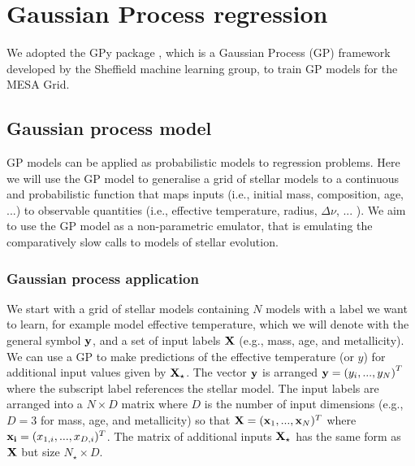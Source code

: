 \section{Gaussian Process regression}\label{GPR}

We adopted the GPy package \citep{gpy2014}, which is a Gaussian Process (GP) framework developed by the Sheffield machine learning group, to train GP models for the \textsc{MESA} Grid. 

\subsection{Gaussian process model}

GP models can be applied as probabilistic models to regression problems.  Here we will use the GP model to generalise a grid of stellar models to a continuous and probabilistic function that maps inputs (i.e., initial mass, composition, age, ...) to observable quantities (i.e., effective temperature, radius, $\Delta \nu$, ... ).  We aim to use the GP model as a non-parametric emulator, that is emulating the comparatively slow calls to models of stellar evolution. 

\subsubsection{Gaussian process application}

We start with a grid of stellar models containing $N$ models with a label we  want to learn, for example model effective temperature, which we will denote with the general symbol $\bf y$, and a set of input labels $\bf X$ (e.g., mass, age, and metallicity).  We can use a GP to make predictions of the effective temperature (or $y$) for additional input values given by $\bf X_{\star}$.  The vector $\bf y$ is arranged ${\bf y} = \left(y_{i}, ... ,y_{N} \right)^{T}$ where the subscript label references the stellar model.  The input labels are arranged into a $N \times D$ matrix where $D$ is the number of input dimensions (e.g., $D=3$ for mass, age, and metallicity) so that ${\bf X} = ({\bf x}_{1}, ..., {\bf x}_{N})^{T}$ where ${\bf x_{i}} = (x_{1, i}, ..., x_{D, i})^{T}$.  The matrix of additional inputs $\bf X_{\star}$ has the same form as $\bf X$ but size $N_{\star} \times D$.


